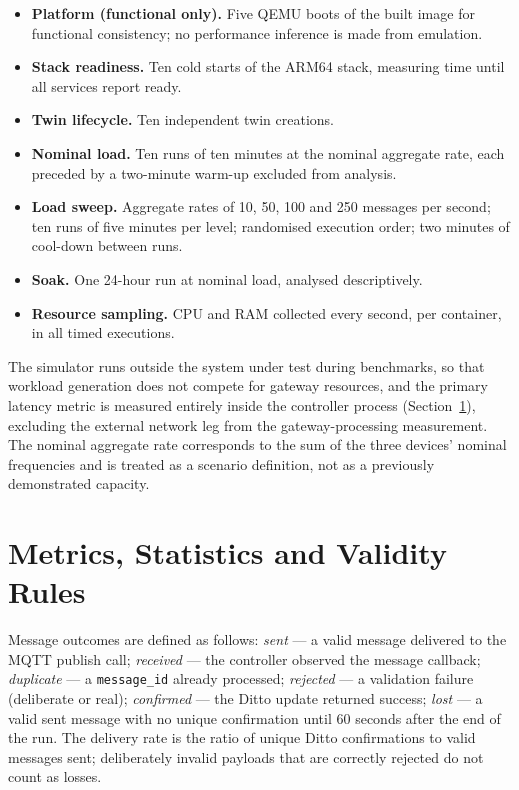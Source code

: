 \begin{itemize}
  \item \textbf{Platform (functional only).} Five QEMU boots of the built
        image for functional consistency; no performance inference is made
        from emulation.
  \item \textbf{Stack readiness.} Ten cold starts of the ARM64 stack,
        measuring time until all services report ready.
  \item \textbf{Twin lifecycle.} Ten independent twin creations.
  \item \textbf{Nominal load.} Ten runs of ten minutes at the nominal
        aggregate rate, each preceded by a two-minute warm-up excluded from
        analysis.
  \item \textbf{Load sweep.} Aggregate rates of 10, 50, 100 and 250 messages
        per second; ten runs of five minutes per level; randomised execution
        order; two minutes of cool-down between runs.
  \item \textbf{Soak.} One 24-hour run at nominal load, analysed
        descriptively.
  \item \textbf{Resource sampling.} \ac{CPU} and \ac{RAM} collected every
        second, per container, in all timed executions.
\end{itemize}

The simulator runs outside the system under test during benchmarks, so that
workload generation does not compete for gateway resources, and the primary
latency metric is measured entirely inside the controller process
(Section~\ref{sec:method-stats}), excluding the external network leg from the
gateway-processing measurement. The nominal aggregate rate corresponds to the
sum of the three devices' nominal frequencies and is treated as a scenario
definition, not as a previously demonstrated capacity.

\section{Metrics, Statistics and Validity Rules}
\label{sec:method-stats}

\noindent Message outcomes are defined as follows: \emph{sent} --- a valid
message delivered to the \ac{MQTT} publish call; \emph{received} --- the
controller observed the message callback; \emph{duplicate} --- a
\texttt{message\_id} already processed; \emph{rejected} --- a validation
failure (deliberate or real); \emph{confirmed} --- the Ditto update returned
success; \emph{lost} --- a valid sent message with no unique confirmation
until 60 seconds after the end of the run. The delivery rate is the ratio of
unique Ditto confirmations to valid messages sent; deliberately invalid
payloads that are correctly rejected do not count as losses.

